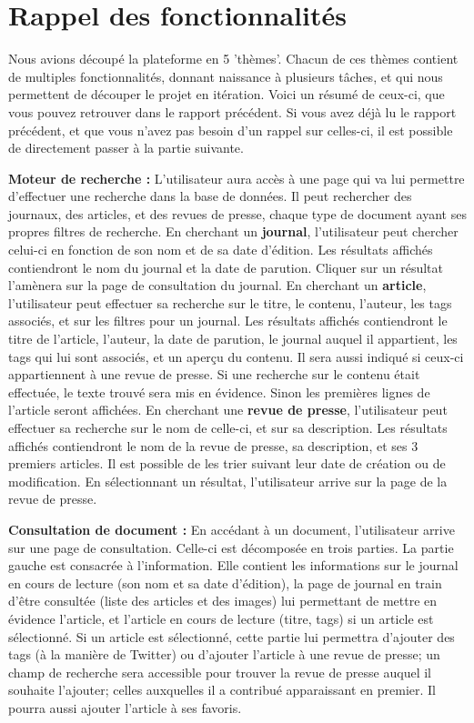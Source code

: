 \section{Rappel des fonctionnalités}

	Nous avions découpé la plateforme en 5 'thèmes'. Chacun de ces thèmes contient de multiples fonctionnalités, donnant naissance à plusieurs tâches, et qui nous permettent de découper le projet en itération. Voici un résumé de ceux-ci, que vous pouvez retrouver dans le rapport précédent. Si vous avez déjà lu le rapport précédent, et que vous n'avez pas besoin d'un rappel sur celles-ci, il est possible de directement passer à la partie suivante.

	\textbf{Moteur de recherche :} L'utilisateur aura accès à une page qui va lui permettre d'effectuer une recherche dans la base de données. Il peut rechercher des journaux, des articles, et des revues de presse, chaque type de document ayant ses propres filtres de recherche. En cherchant un \textbf{journal}, l'utilisateur peut chercher celui-ci en fonction de son nom et de sa date d'édition. Les résultats affichés contiendront le nom du journal et la date de parution. Cliquer sur un résultat l'amènera sur la page de consultation du journal. En cherchant un \textbf{article}, l'utilisateur peut effectuer sa recherche sur le titre, le contenu, l'auteur, les tags associés, et sur les filtres pour un journal. Les résultats affichés contiendront le titre de l'article, l'auteur, la date de parution, le journal auquel il appartient, les tags qui lui sont associés, et un aperçu du contenu. Il sera aussi indiqué si ceux-ci appartiennent à une revue de presse. Si une recherche sur le contenu était effectuée, le texte trouvé sera mis en évidence. Sinon les premières lignes de l'article seront affichées. En cherchant une \textbf{revue de presse}, l'utilisateur peut effectuer sa recherche sur le nom de celle-ci, et sur sa description. Les résultats affichés contiendront le nom de la revue de presse, sa description, et ses 3 premiers articles. Il est possible de les trier suivant leur date de création ou de modification. En sélectionnant un résultat, l'utilisateur arrive sur la page de la revue de presse. 

	\textbf{Consultation de document :} En accédant à un document, l'utilisateur arrive sur une page de consultation. Celle-ci est décomposée en trois parties. La partie gauche est consacrée à l'information. Elle contient les informations sur le journal en cours de lecture (son nom et sa date d'édition), la page de journal en train d'être consultée (liste des articles et des images) lui permettant de mettre en évidence l'article, et l'article en cours de lecture (titre, tags) si un article est sélectionné. Si un article est sélectionné, cette partie lui permettra d'ajouter des tags (à la manière de Twitter) ou d'ajouter l'article à une revue de presse; un champ de recherche sera accessible pour trouver la revue de presse auquel il souhaite l'ajouter; celles auxquelles il a contribué apparaissant en premier. Il pourra aussi ajouter l'article à ses favoris. 

